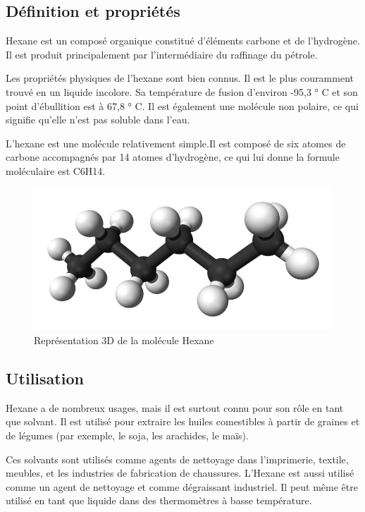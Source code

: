 \subsection{Définition et propriétés}
Hexane est un composé organique constitué d'éléments carbone et de l'hydrogène. Il est produit principalement par l'intermédiaire du raffinage du pétrole.

Les propriétés physiques de l'hexane sont bien connus. Il est le plus couramment trouvé en un liquide incolore. Sa température de fusion d'environ -95,3 ° C et son point d'ébullition est à 67,8 ° C. Il est également une molécule non polaire, ce qui signifie qu'elle n'est pas soluble dans l'eau.

L'hexane est une molécule relativement simple.Il est composé de six atomes de carbone accompagnés par 14 atomes d'hydrogène, ce qui lui donne la formule moléculaire est C6H14. 

\begin{figure}[h]
\centering
\includegraphics[scale=0.4]{./Figures/Hexane-3D-balls.png}
\caption{Représentation 3D de la molécule Hexane}
\end{figure}

\subsection{Utilisation}


Hexane a de nombreux usages, mais il est surtout connu pour son rôle en tant que solvant. 
Il est utilisé pour extraire les huiles comestibles à partir de graines et de légumes (par exemple, le soja, les arachides, le maïs).

Ces solvants sont utilisés comme agents de nettoyage dans l'imprimerie, textile, meubles, et les industries de fabrication de chaussures.
L'Hexane est aussi utilisé comme un agent de nettoyage et comme dégraissant industriel.
Il peut même être utilisé en tant que liquide dans des thermomètres à basse température. 


